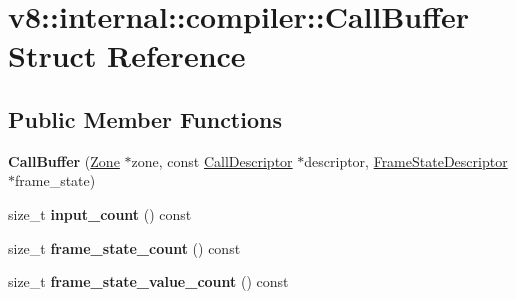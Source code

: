 \hypertarget{structv8_1_1internal_1_1compiler_1_1_call_buffer}{}\section{v8\+:\+:internal\+:\+:compiler\+:\+:Call\+Buffer Struct Reference}
\label{structv8_1_1internal_1_1compiler_1_1_call_buffer}
\subsection*{Public Member Functions}
\begin{DoxyCompactItemize}
\item 
{\bfseries Call\+Buffer} (\hyperlink{classv8_1_1internal_1_1_zone}{Zone} $\ast$zone, const \hyperlink{classv8_1_1internal_1_1compiler_1_1_call_descriptor}{Call\+Descriptor} $\ast$descriptor, \hyperlink{classv8_1_1internal_1_1compiler_1_1_frame_state_descriptor}{Frame\+State\+Descriptor} $\ast$frame\+\_\+state)\hypertarget{structv8_1_1internal_1_1compiler_1_1_call_buffer_a43f5f26b48c10f2fbb83779a814b4843}{}\label{structv8_1_1internal_1_1compiler_1_1_call_buffer_a43f5f26b48c10f2fbb83779a814b4843}

\item 
size\+\_\+t {\bfseries input\+\_\+count} () const \hypertarget{structv8_1_1internal_1_1compiler_1_1_call_buffer_aeb412941de0ec633ff1487c1041b6b97}{}\label{structv8_1_1internal_1_1compiler_1_1_call_buffer_aeb412941de0ec633ff1487c1041b6b97}

\item 
size\+\_\+t {\bfseries frame\+\_\+state\+\_\+count} () const \hypertarget{structv8_1_1internal_1_1compiler_1_1_call_buffer_a5a46531a4f07bdb5e0cf72d9d7c1e26a}{}\label{structv8_1_1internal_1_1compiler_1_1_call_buffer_a5a46531a4f07bdb5e0cf72d9d7c1e26a}

\item 
size\+\_\+t {\bfseries frame\+\_\+state\+\_\+value\+\_\+count} () const \hypertarget{structv8_1_1internal_1_1compiler_1_1_call_buffer_a5e44fb087d62f2e19e7c68edf03a9d1e}{}\label{structv8_1_1internal_1_1compiler_1_1_call_buffer_a5e44fb087d62f2e19e7c68edf03a9d1e}

\end{DoxyCompactItemize}
